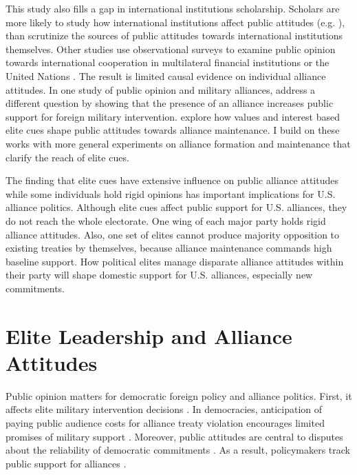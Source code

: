 \documentclass[12pt]{article}
\begin{document}
This study also fills a gap in international institutions scholarship. 
Scholars are more likely to study how international institutions affect public attitudes (e.g. \citep{Griecoetal2011, KayaWalker2014, Greenhill2020}), than scrutinize the sources of public attitudes towards international institutions themselves. 
Other studies use observational surveys to examine public opinion towards international cooperation in multilateral financial institutions \citep{Edwards2009} or the United Nations \citep{Torgler2008, DellmuthTallberg2015}. 
The result is limited causal evidence on individual alliance attitudes.
In one study of public opinion and military alliances, \citet{TomzWeeks2021} address a different question by showing that the presence of an alliance increases public support for foreign military intervention. 
\citet{Chuetal2021} explore how values and interest based elite cues shape public attitudes towards alliance maintenance. 
I build on these works with more general experiments on alliance formation and maintenance that clarify the reach of elite cues.


The finding that elite cues have extensive influence on public alliance attitudes while some individuals hold rigid opinions has important implications for U.S. alliance politics. 
Although elite cues affect public support for U.S. alliances, they do not reach the whole electorate.
One wing of each major party holds rigid alliance attitudes.
Also, one set of elites cannot produce majority opposition to existing treaties by themselves, because alliance maintenance commands high baseline support. 
How political elites manage disparate alliance attitudes within their party will shape domestic support for U.S. alliances, especially new commitments.



\section{Elite Leadership and Alliance Attitudes}


Public opinion matters for democratic foreign policy and alliance politics.
First, it affects elite military intervention decisions \citep{Tomzetal2020, LinGreenberg2021}. 
In democracies, anticipation of paying public audience costs for alliance treaty violation encourages limited promises of military support \citep{Chibaetal2015, FjelstulReiter2019}. 
Moreover, public attitudes are central to disputes about the reliability of democratic commitments \citep{Gaubatz1996, GartzkeGleditsch2004}. 
As a result, policymakers track public support for alliances \citep{Sayle2019}. 
\end{document}
